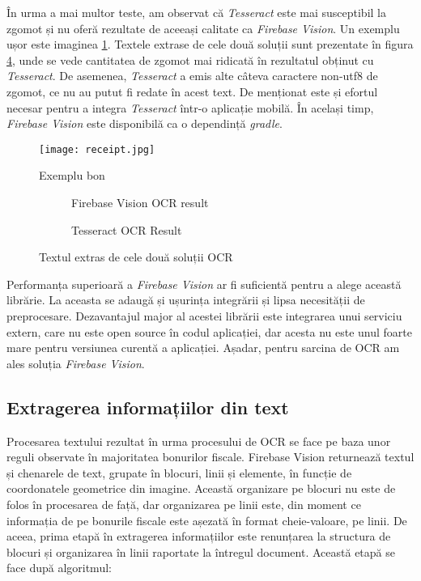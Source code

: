 În urma a mai multor teste, am observat că \emph{Tesseract} este mai susceptibil la zgomot și nu oferă rezultate de aceeași calitate ca \emph{Firebase Vision}. Un exemplu ușor este imaginea \ref{fig:exampleReceipt}. Textele extrase de cele două soluții sunt prezentate în figura \ref{fig:ocrResults}, unde se vede cantitatea de zgomot mai ridicată în rezultatul obținut cu \emph{Tesseract}. De asemenea, \emph{Tesseract} a emis alte câteva caractere non-utf8 de zgomot, ce nu au putut fi redate în acest text. De menționat este și efortul necesar pentru a integra \emph{Tesseract} într-o aplicație mobilă. În același timp, \emph{Firebase Vision} este disponibilă ca o dependință \emph{gradle}.

\begin{figure}[hb]
  \centering
  \texttt{[image: receipt.jpg]}
  \caption{Exemplu bon}
  \label{fig:exampleReceipt}
\end{figure}

\begin{figure}
  \begin{subfigure}{0.48\textwidth}
  
  \caption{Firebase Vision OCR result}
  \label{fig:firebaseResult}
  \end{subfigure}
  \hfill
  \begin{subfigure}{0.48\textwidth}
  
  \caption{Tesseract OCR Result}
  \label{fig:tesseractResult}
  \end{subfigure}
  \caption{Textul extras de cele două soluții OCR}
  \label{fig:ocrResults}
\end{figure}

Performanța superioară a \emph{Firebase Vision} ar fi suficientă pentru a alege această librărie. La aceasta se adaugă și ușurința integrării și lipsa necesității de preprocesare. Dezavantajul major al acestei librării este integrarea unui serviciu extern, care nu este open source în codul aplicației, dar acesta nu este unul foarte mare pentru versiunea curentă a aplicației. Așadar, pentru sarcina de OCR am ales soluția \emph{Firebase Vision}.

\subsection{Extragerea informațiilor din text}

Procesarea textului rezultat în urma procesului de OCR se face pe baza unor reguli observate în majoritatea bonurilor fiscale. Firebase Vision returnează textul și chenarele de text, grupate în blocuri, linii și elemente, în funcție de coordonatele geometrice din imagine. Această organizare pe blocuri nu este de folos în procesarea de față, dar organizarea pe linii este, din moment ce informația de pe bonurile fiscale este așezată în format cheie-valoare, pe linii. De aceea, prima etapă în extragerea informațiilor este renunțarea la structura de blocuri și organizarea în linii raportate la întregul document. Această etapă se face după algoritmul:

